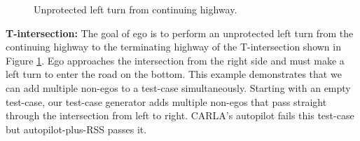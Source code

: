 \begin{figure}
\begin{minipage}[t]{.499\linewidth}
  \end{minipage}%
  \caption{Unprotected left turn from continuing highway.}\label{fig:continuing}%
\end{figure}%


\textbf{T-intersection:} The goal of ego is to perform an unprotected left turn from the continuing highway to the terminating highway of the T-intersection shown in Figure \ref{fig:continuing}.
%
Ego approaches the intersection from the right side and must make a left turn to enter the road on the bottom.
%
This example demonstrates that we can add multiple non-egos to a test-case simultaneously.
%
Starting with an empty test-case, our test-case generator adds multiple non-egos that pass straight through the intersection from left to right.
%
CARLA's autopilot fails this test-case but autopilot-plus-RSS passes it.



